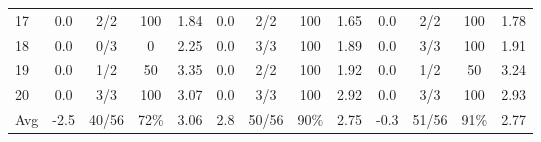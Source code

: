 \begin{table}[p]
{\begin{tabular}{l|cccc|cccc|cccc}
17 & 0.0 & 2/2 & 100 & 1.84 & 0.0 & 2/2 & 100 & 1.65 & 0.0 & 2/2 & 100 & 1.78 \\
18 & 0.0 & 0/3 & 0 & 2.25 & 0.0 & 3/3 & 100 & 1.89 & 0.0 & 3/3 & 100 & 1.91 \\
19 & 0.0 & 1/2 & 50 & 3.35 & 0.0 & 2/2 & 100 & 1.92 & 0.0 & 1/2 & 50 & 3.24 \\
20 & 0.0 & 3/3 & 100 & 3.07 & 0.0 & 3/3 & 100 & 2.92 & 0.0 & 3/3 & 100 & 2.93 \\
\midrule
Avg & -2.5 & 40/56 & 72\% & 3.06 & 2.8 & 50/56 & 90\% & 2.75 & -0.3 & 51/56 & 91\% & 2.77 \\
\bottomrule
\end{tabular}%
}
\end{table}
